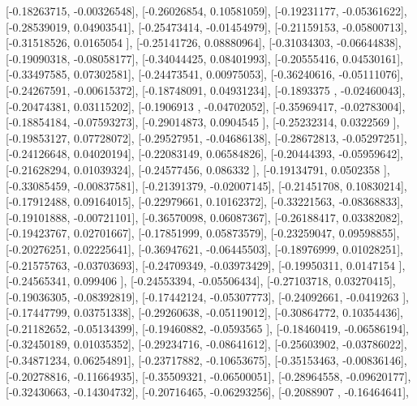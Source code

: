 \documentclass{article}
\begin{document}
       [-0.18263715, -0.00326548],
       [-0.26026854,  0.10581059],
       [-0.19231177, -0.05361622],
       [-0.28539019,  0.04903541],
       [-0.25473414, -0.01454979],
       [-0.21159153, -0.05800713],
       [-0.31518526,  0.0165054 ],
       [-0.25141726,  0.08880964],
       [-0.31034303, -0.06644838],
       [-0.19090318, -0.08058177],
       [-0.34044425,  0.08401993],
       [-0.20555416,  0.04530161],
       [-0.33497585,  0.07302581],
       [-0.24473541,  0.00975053],
       [-0.36240616, -0.05111076],
       [-0.24267591, -0.00615372],
       [-0.18748091,  0.04931234],
       [-0.1893375 , -0.02460043],
       [-0.20474381,  0.03115202],
       [-0.1906913 , -0.04702052],
       [-0.35969417, -0.02783004],
       [-0.18854184, -0.07593273],
       [-0.29014873,  0.0904545 ],
       [-0.25232314,  0.0322569 ],
       [-0.19853127,  0.07728072],
       [-0.29527951, -0.04686138],
       [-0.28672813, -0.05297251],
       [-0.24126648,  0.04020194],
       [-0.22083149,  0.06584826],
       [-0.20444393, -0.05959642],
       [-0.21628294,  0.01039324],
       [-0.24577456,  0.086332  ],
       [-0.19134791,  0.0502358 ],
       [-0.33085459, -0.00837581],
       [-0.21391379, -0.02007145],
       [-0.21451708,  0.10830214],
       [-0.17912488,  0.09164015],
       [-0.22979661,  0.10162372],
       [-0.33221563, -0.08368833],
       [-0.19101888, -0.00721101],
       [-0.36570098,  0.06087367],
       [-0.26188417,  0.03382082],
       [-0.19423767,  0.02701667],
       [-0.17851999,  0.05873579],
       [-0.23259047,  0.09598855],
       [-0.20276251,  0.02225641],
       [-0.36947621, -0.06445503],
       [-0.18976999,  0.01028251],
       [-0.21575763, -0.03703693],
       [-0.24709349, -0.03973429],
       [-0.19950311,  0.0147154 ],
       [-0.24565341,  0.099406  ],
       [-0.24553394, -0.05506434],
       [-0.27103718,  0.03270415],
       [-0.19036305, -0.08392819],
       [-0.17442124, -0.05307773],
       [-0.24092661, -0.0419263 ],
       [-0.17447799,  0.03751338],
       [-0.29260638, -0.05119012],
       [-0.30864772,  0.10354436],
       [-0.21182652, -0.05134399],
       [-0.19460882, -0.0593565 ],
       [-0.18460419, -0.06586194],
       [-0.32450189,  0.01035352],
       [-0.29234716, -0.08641612],
       [-0.25603902, -0.03786022],
       [-0.34871234,  0.06254891],
       [-0.23717882, -0.10653675],
       [-0.35153463, -0.00836146],
       [-0.20278816, -0.11664935],
       [-0.35509321, -0.06500051],
       [-0.28964558, -0.09620177],
       [-0.32430663, -0.14304732],
       [-0.20716465, -0.06293256],
       [-0.2088907 , -0.16464641],
\end{document}
